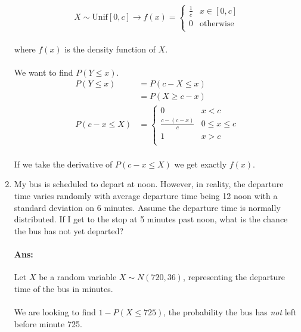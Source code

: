 \documentclass[letterpaper,12pt]{article}
\begin{document}
\begin{enumerate}
    \[
        X \sim \mathrm{Unif}[0,c] \to 
        f(x) = \begin{cases}
            \frac{1}{c} & x \in [0,c] \\
            0 & \mathrm{otherwise}\\
            \end{cases}
    \]

    \paragraph{}where $f(x)$ is the density function of $X$.
    \paragraph{}We want to find $P(Y\le x)$.
    \begin{align*}
        P(Y\le x) &= P(c -X \le x)\\
                  &= P(X \ge c-x)\\
         P(c-x \le X)&=
                   \begin{cases}
                      0 & x < c \\
                      \frac{c-(c-x)}{c} & 0 \le x \le c \\
                      1 & x > c \\
                      \end{cases}
    \end{align*}
    \paragraph{}If we take the derivative of $P(c-x \le X)$ we get exactly $f(x)$.
\item My bus is scheduled to depart at noon. However, in reality, the departure time varies
randomly with average departure time being 12 noon with a standard deviation on 6
minutes. Assume the departure time is normally distributed. If I get to the stop at 5
minutes past noon, what is the chance the bus has not yet departed?

\paragraph{Ans:}Let $X$ be a random variable $X \sim N(720, 36)$, representing the departure time of the
bus in minutes. 

\paragraph{}We are looking to find $1 - P(X \le 725)$, the probability the bus has \emph{not} left 
before minute 725.


\end{enumerate}
\end{document}
